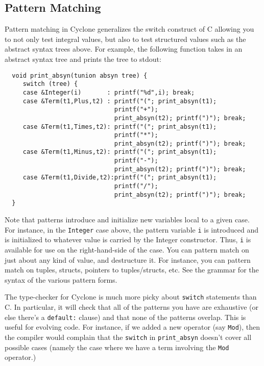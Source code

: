 \subsection{Pattern Matching}
Pattern matching in Cyclone generalizes the switch construct of C
allowing you to not only test integral values, but also to test
structured values such as the abstract syntax trees above.  For
example, the following function takes in an abstract syntax tree and
prints the tree to stdout:
\begin{verbatim}
  void print_absyn(tunion absyn tree) {
     switch (tree) {
     case &Integer(i)       : printf("%d",i); break;
     case &Term(t1,Plus,t2) : printf("("; print_absyn(t1);
                              printf("+");
                              print_absyn(t2); printf(")"); break;
     case &Term(t1,Times,t2): printf("("; print_absyn(t1);
                              printf("*");
                              print_absyn(t2); printf(")"); break;
     case &Term(t1,Minus,t2): printf("("; print_absyn(t1);
                              printf("-");
                              print_absyn(t2); printf(")"); break;
     case &Term(t1,Divide,t2):printf("("; print_absyn(t1);
                              printf("/");
                              print_absyn(t2); printf(")"); break;
  }
\end{verbatim}

Note that patterns introduce and initialize new variables local to a
given case.  For instance, in the \texttt{Integer} case above, the
pattern variable \texttt{i} is introduced and is initialized to whatever
value is carried by the Integer constructor.  Thus, \texttt{i} is
available for use on the right-hand-side of the case.  You can pattern
match on just about any kind of value, and destructure it.  For
instance, you can pattern match on tuples, structs, pointers to
tuples/structs, etc.  See the grammar for the syntax of the various
pattern forms.

The type-checker for Cyclone is much more picky about \texttt{switch}
statements than C\@.  In particular, it will check that all of the
patterns you have are exhaustive (or else there's a \texttt{default:}
clause) and that none of the patterns overlap.  This is useful for
evolving code.  For instance, if we added a new operator (say
\texttt{Mod}), then the compiler would complain that the \texttt{switch}
in \texttt{print_absyn} doesn't cover all possible cases (namely the
case where we have a term involving the \texttt{Mod} operator.)

